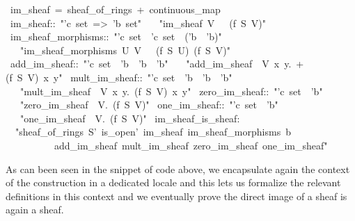 \documentclass[12pt]{scrartcl}
\begin{document}
\begin{isabelle}
\ im\_sheaf\ =\ sheaf\_of\_rings\ +\ continuous\_map\isanewline
{}\isanewline
\isanewline
{}\ im\_sheaf::\ "'c\ set\ =>\ 'b\ set"\isanewline
\ \ \ "im\_sheaf\ V\ \isasymequiv \ \isasymFF \ (f\isactrlsup \isasyminverse \ S\ V)"\isanewline
\isanewline
{}\ im\_sheaf\_morphisms::\ "'c\ set\ \isasymRightarrow \ 'c\ set\ \isasymRightarrow \ ('b\ \isasymRightarrow \ 'b)"\isanewline
\ \ \ "im\_sheaf\_morphisms\ U\ V\ \isasymequiv \ \isasymrho \ (f\isactrlsup \isasyminverse \ S\ U)\ (f\isactrlsup \isasyminverse \ S\ V)"\isanewline
\isanewline
{}\ add\_im\_sheaf::\ "'c\ set\ \isasymRightarrow \ 'b\ \isasymRightarrow \ 'b\ \isasymRightarrow \ 'b"\isanewline
\ \ \ "add\_im\_sheaf\ \isasymequiv \ \isasymlambda V\ x\ y.\ +\isactrlbsub (f\isactrlsup \isasyminverse \ S\ V)\isactrlesub \ x\ y"\isanewline
\isanewline
{}\ mult\_im\_sheaf::\ "'c\ set\ \isasymRightarrow \ 'b\ \isasymRightarrow \ 'b\ \isasymRightarrow \ 'b"\isanewline
\ \ \ "mult\_im\_sheaf\ \isasymequiv \ \isasymlambda V\ x\ y.\ \isasymcdot \isactrlbsub (f\isactrlsup \isasyminverse \ S\ V)\isactrlesub \ x\ y"\isanewline
\isanewline
{}\ zero\_im\_sheaf::\ "'c\ set\ \isasymRightarrow \ 'b"\isanewline
\ \ \ "zero\_im\_sheaf\ \isasymequiv \ \isasymlambda V.\ \isasymzero \isactrlbsub (f\isactrlsup \isasyminverse \ S\ V)\isactrlesub "\isanewline
\isanewline
{}\ one\_im\_sheaf::\ "'c\ set\ \isasymRightarrow \ 'b"\isanewline
\ \ \ "one\_im\_sheaf\ \isasymequiv \ \isasymlambda V.\ \isasymone \isactrlbsub (f\isactrlsup \isasyminverse \ S\ V)\isactrlesub "\isanewline
\isanewline
{}\ im\_sheaf\_is\_sheaf:\isanewline
\ \ "sheaf\_of\_rings\ S'\ is\_open'\ im\_sheaf\ im\_sheaf\_morphisms\ b\isanewline
\ \ \ \ \ \ \ \ \ \ add\_im\_sheaf\ mult\_im\_sheaf\ zero\_im\_sheaf\ one\_im\_sheaf"\isanewline
{}
\end{isabelle}

As can been seen in the snippet of code above, we encapsulate again the context of the construction in a dedicated locale and this lets us formalize the relevant definitions in this context and we eventually prove the direct image of a sheaf is again a sheaf. 
\end{document}

